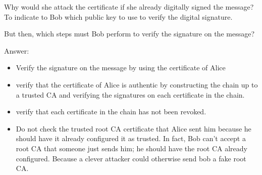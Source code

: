 Why would she attack the certificate if she already digitally signed the message? To indicate to Bob which public key to use to verify the digital signature.

But then, which steps must Bob perform to verify the signature on the message?

Answer:
\begin{itemize}
    \item Verify the signature on the message by using the certificate of Alice
    \item verify that the certificate of Alice is authentic by constructing the chain up to a trusted CA and verifying the signatures on each certificate in the chain.

    \item verify that each certificate in the chain has not been revoked.

    \item Do not check the trusted root CA certificate that Alice sent him because he should have it already configured it as trusted. In fact, Bob can't accept a root CA that someone just sends him; he should have the root CA already configured. Because a clever attacker could otherwise send bob a fake root CA.
\end{itemize}
